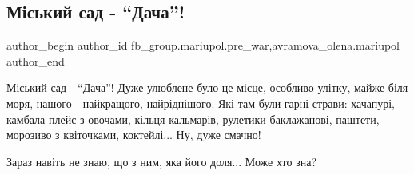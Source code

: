  
 
 
 
 

\subsection{Міський сад - \enquote{Дача}!}
\label{sec:04_02_2023.fb.fb_group.mariupol.pre_war.2.m_skii_sad____dacha_}
 
\ifcmt
 author_begin
   author_id fb_group.mariupol.pre_war,avramova_olena.mariupol
 author_end
\fi

Міський сад - \enquote{Дача}! Дуже улюблене було це місце, особливо улітку, майже біля
моря, нашого - найкращого, найріднішого. Які там були гарні страви: хачапурі,
камбала-плейс з овочами, кільця кальмарів, рулетики баклажанові, паштети,
морозиво з квіточками, коктейлі... Ну, дуже смачно!

Зараз навіть не знаю, що з ним, яка його доля... Може хто зна?

